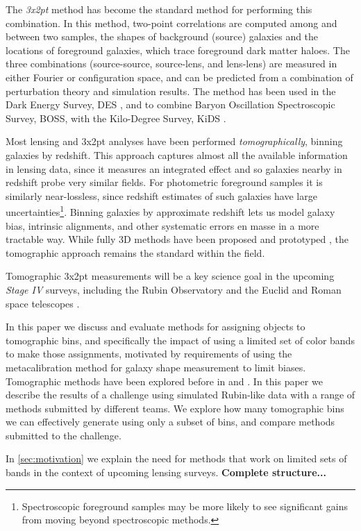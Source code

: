 \documentclass[twocolumn,twocolappendix]{aastex63}
\begin{document}
The \emph{3x2pt} method has become the standard method for performing this combination.
In this method, two-point correlations are computed among and between two samples, the shapes of 
background (source) galaxies and the locations of foreground galaxies, which trace foreground
dark matter haloes.  The three combinations (source-source, source-lens, and lens-lens) are
measured in either Fourier or configuration space, and can be predicted from a combination of 
perturbation theory and simulation results.  The method has been used in the Dark Energy Survey, DES
\citep{des-3x2pt}, and to combine Baryon Oscillation Spectroscopic Survey, BOSS, with the Kilo-Degree 
Survey, KiDS \citep{kids-3x2pt}.

Most lensing and 3x2pt analyses have been performed \emph{tomographically}, 
binning galaxies by redshift.
This approach captures almost all the available information in lensing data, since it measures
an integrated effect and so galaxies nearby in redshift probe very similar fields.  For photometric
foreground samples it is similarly near-lossless, since redshift estimates of such galaxies have
large uncertainties\footnote{Spectroscopic foreground samples may be more likely to see significant 
gains from moving beyond spectroscopic methods.}.  Binning galaxies by approximate redshift lets us 
model galaxy bias, intrinsic alignments, and other systematic errors en masse in a more tractable way.
While fully 3D methods have been proposed and prototyped \citep{kitching,more}, the tomographic 
approach remains the standard within the field.

Tomographic 3x2pt measurements will be a key science goal in the upcoming \emph{Stage IV} surveys,
including the Rubin Observatory \citep{rubin} and the Euclid and Roman space telescopes \citep{euclid,roman}.

In this paper we discuss and evaluate methods for assigning objects to tomographic bins, and 
specifically the impact
of using a limited set of color bands to make those assignments, motivated by requirements of using the
metacalibration method for galaxy shape measurement to limit biases.  Tomographic methods have been 
explored before in \citet{jain} and \citet{kitching2019}.  In this paper we describe the results of a 
challenge using simulated Rubin-like data with a range of methods submitted by different teams.  We explore how many tomographic bins we can effectively generate using only a subset of bins, and compare methods submitted to the challenge.

In \autoref{sec:motivation} we explain the need for methods that work on limited sets of bands in the context of upcoming lensing surveys.  \textbf{Complete structure...}
\end{document}
